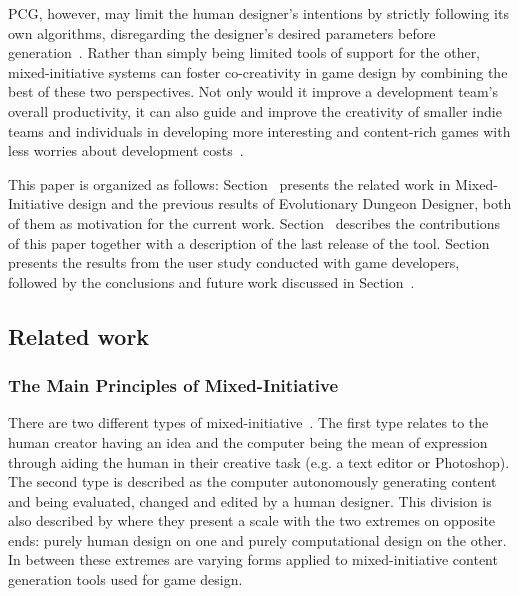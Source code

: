 PCG, however, may limit the human designer’s intentions by strictly following its own algorithms, disregarding the designer’s desired parameters before generation~. Rather than simply being limited tools of support for the other, mixed-initiative systems can foster co-creativity in game design by combining the best of these two perspectives. Not only would it improve a development team’s overall productivity, it can also guide and improve the creativity of smaller indie teams and individuals in developing more interesting and content-rich games with less worries about development costs~. 

This paper is organized as follows: Section~ presents the related work in Mixed-Initiative design and the previous results of Evolutionary Dungeon Designer, both of them as motivation for the current work. Section~ describes the contributions of this paper together with a description of the last release of the tool. Section~ presents the results from the user study conducted with game developers, followed by the conclusions and future work discussed in Section~.

\subsection{Related work} \label{p1background}
\subsubsection{The Main Principles of Mixed-Initiative}

There are two different types of mixed-initiative~. The first type relates to the human creator having an idea and the computer being the mean of expression through aiding the human in their creative task (e.g. a text editor or Photoshop). The second type is described as the computer autonomously generating content and being evaluated, changed and edited by a human designer. This division is also described by  where they present a scale with the two extremes on opposite ends: purely human design on one and purely computational design on the other. In between these extremes are varying forms applied to mixed-initiative content generation tools used for game design. 

